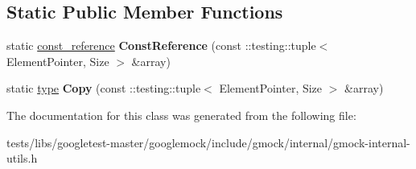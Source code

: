 \subsection*{Static Public Member Functions}
\begin{DoxyCompactItemize}
\item 
\mbox{\label{classtesting_1_1internal_1_1StlContainerView_3_01_1_1testing_1_1tuple_3_01ElementPointer_00_01Size_01_4_01_4_aba9be6fade312dd735ac47a3cb8cc355}} 
static \hyperlink{classtesting_1_1internal_1_1NativeArray}{const\+\_\+reference} {\bfseries Const\+Reference} (const \+::testing\+::tuple$<$ Element\+Pointer, Size $>$ \&array)
\item 
\mbox{\label{classtesting_1_1internal_1_1StlContainerView_3_01_1_1testing_1_1tuple_3_01ElementPointer_00_01Size_01_4_01_4_a3d42db21a2f88d407a4b5acbb7fe252c}} 
static \hyperlink{classtesting_1_1internal_1_1NativeArray}{type} {\bfseries Copy} (const \+::testing\+::tuple$<$ Element\+Pointer, Size $>$ \&array)
\end{DoxyCompactItemize}


The documentation for this class was generated from the following file\+:\begin{DoxyCompactItemize}
\item 
tests/libs/googletest-\/master/googlemock/include/gmock/internal/gmock-\/internal-\/utils.\+h\end{DoxyCompactItemize}
